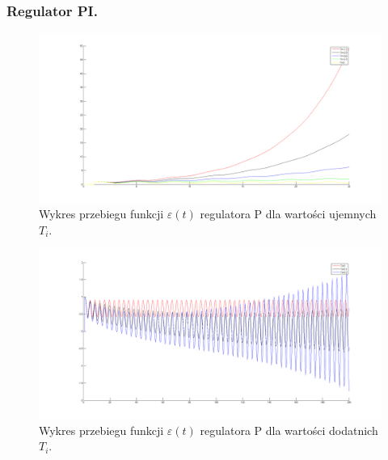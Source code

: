 \documentclass[a4paper,10pt]{article}
\begin{document}
\subsubsection{Regulator PI.}
\begin{figure}[!h]
    \centering
	\includegraphics[width=120mm]{CW2-regulatorPI-eu.png}
	\caption{Wykres przebiegu funkcji $\varepsilon(t)$ regulatora P dla wartości ujemnych $T_{i}$.}
    \label{fig:regulatorPeu}
\end{figure}
\begin{figure}[!h]
    \centering
	\includegraphics[width=120mm]{CW2-regulatorPI-ed.png}
	\caption{Wykres przebiegu funkcji $\varepsilon(t)$ regulatora P dla wartości dodatnich $T_{i}$.}
    \label{fig:regulatorPed}
\end{figure}
\end{document}
